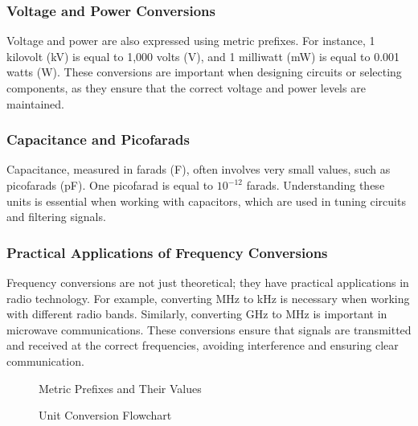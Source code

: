 \subsubsection*{Voltage and Power Conversions}
Voltage and power are also expressed using metric prefixes. For instance, 1 kilovolt (kV) is equal to 1,000 volts (V), and 1 milliwatt (mW) is equal to 0.001 watts (W). These conversions are important when designing circuits or selecting components, as they ensure that the correct voltage and power levels are maintained.

\subsubsection*{Capacitance and Picofarads}
Capacitance, measured in farads (F), often involves very small values, such as picofarads (pF). One picofarad is equal to $10^{-12}$ farads. Understanding these units is essential when working with capacitors, which are used in tuning circuits and filtering signals.

\subsubsection*{Practical Applications of Frequency Conversions}
Frequency conversions are not just theoretical; they have practical applications in radio technology. For example, converting MHz to kHz is necessary when working with different radio bands. Similarly, converting GHz to MHz is important in microwave communications. These conversions ensure that signals are transmitted and received at the correct frequencies, avoiding interference and ensuring clear communication.

\begin{figure}[htbp]
    \centering
    \caption{Metric Prefixes and Their Values}
    \label{fig:metric-prefixes}
\end{figure}

\begin{figure}[htbp]
    \centering
    \caption{Unit Conversion Flowchart}
    \label{fig:unit-conversion-flowchart}
\end{figure}

